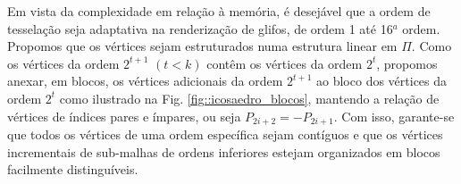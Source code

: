 



Em vista da complexidade em relação à memória, é desejável que a ordem de tesselação seja adaptativa na renderização de glifos, de ordem 1 até 16$^a$ ordem. Propomos que os vértices sejam estruturados numa estrutura linear em $\Pi$. Como os vértices da ordem $2^{t+1}$ $(t < k)$ contêm os vértices da ordem $2^{t}$, propomos anexar, em blocos, os vértices adicionais da ordem $2^{t+1}$ ao bloco dos vértices da ordem $2^t$ como ilustrado na Fig. \ref{fig::icosaedro_blocos}, mantendo a relação de vértices de índices pares e ímpares, ou seja $P_{2i+2} = -P_{2i+1}$. Com isso, garante-se que todos os vértices de uma ordem específica sejam contíguos e que os vértices incrementais de sub-malhas de ordens inferiores estejam organizados em blocos facilmente distinguíveis.

